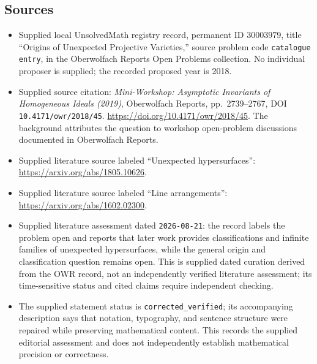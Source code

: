 \documentclass[11pt]{article}
\begin{document}
\subsection{Sources}
\begin{itemize}
\item Supplied local UnsolvedMath registry record, permanent ID \(30003979\), title ``Origins of Unexpected Projective Varieties,'' source problem code \texttt{catalogue entry}, in the Oberwolfach Reports Open Problems collection. No individual proposer is supplied; the recorded proposed year is 2018.
\item Supplied source citation: \emph{Mini-Workshop: Asymptotic Invariants of Homogeneous Ideals (2019)}, Oberwolfach Reports, pp.~2739--2767, DOI \texttt{10.4171/owr/2018/45}. \url{https://doi.org/10.4171/owr/2018/45}. The background attributes the question to workshop open-problem discussions documented in Oberwolfach Reports.
\item Supplied literature source labeled ``Unexpected hypersurfaces'': \url{https://arxiv.org/abs/1805.10626}.
\item Supplied literature source labeled ``Line arrangements'': \url{https://arxiv.org/abs/1602.02300}.
\item Supplied literature assessment dated \texttt{2026-08-21}: the record labels the problem open and reports that later work provides classifications and infinite families of unexpected hypersurfaces, while the general origin and classification question remains open. This is supplied dated curation derived from the OWR record, not an independently verified literature assessment; its time-sensitive status and cited claims require independent checking.
\item The supplied statement status is \texttt{corrected\_verified}; its accompanying description says that notation, typography, and sentence structure were repaired while preserving mathematical content. This records the supplied editorial assessment and does not independently establish mathematical precision or correctness.
\end{itemize}
\end{document}
